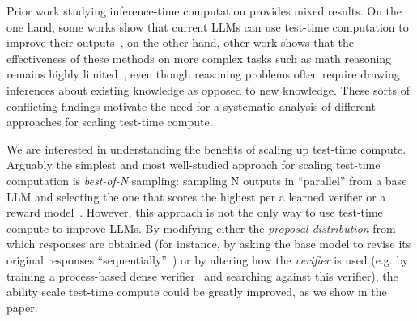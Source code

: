 Prior work studying inference-time computation provides mixed results. On the one hand, some works show that current LLMs can use test-time computation to improve their outputs~\citep{bai2022constitutional,madaan2023selfrefine,du2023improving,saunders2022selfcritiquing,yao2023tree}, on the other hand, other work shows that the effectiveness of these methods on more complex tasks such as math reasoning remains highly limited~\citep{huang2023large,stechly2023gpt4,valmeekam2023large}, even though reasoning problems often require drawing inferences about existing knowledge as opposed to new knowledge. 
These sorts of conflicting findings motivate the need for a systematic analysis of different approaches for scaling test-time compute.

We are interested in understanding the benefits of scaling up test-time compute. Arguably the simplest and most well-studied approach for scaling test-time computation is \emph{best-of-N} sampling: sampling N outputs in ``parallel'' from a  base LLM and selecting the one that scores the highest per a learned verifier or a reward model~\citep{cobbe2021training,lightman2023lets}. However, this approach is not the only way to use test-time compute to improve LLMs. By modifying either the \emph{proposal distribution} from which responses are obtained (for instance, by asking the base model to revise its original responses ``sequentially''~\citep{qu2024recursive}) or by altering how the \emph{verifier} is used (e.g. by training a process-based dense verifier~\citep{lightman2023lets,wang2023mathshepherd} and searching against this verifier), the ability scale test-time compute could be greatly improved, as we show in the paper. 

